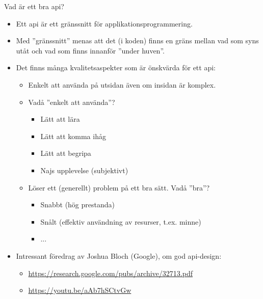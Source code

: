 \begin{Slide}{Vad är ett bra api?}
\begin{itemize}\SlideFontSmall
  \item Ett api  är ett gränssnitt för applikationsprogrammering.
  \item Med ''gränssnitt'' menas att det (i koden) finns en gräns mellan vad som syns utåt och vad som finns innanför ''under huven''.
  \item Det finns många kvalitetsaspekter som är önskvärda för ett api:
\begin{itemize}\SlideFontSmall
  \item Enkelt att använda på utsidan även om insidan är komplex.
  \item Vadå ''enkelt att använda''?
  \begin{itemize}\SlideFontTiny
  \item Lätt att lära
  \item Lätt att komma ihåg
  \item Lätt att begripa
  \item Najs upplevelse (subjektivt)
  \end{itemize}  
  \item Löser ett (generellt) problem på ett bra sätt. Vadå ''bra''?
  \begin{itemize}\SlideFontTiny
    \item Snabbt (hög prestanda)
    \item Snålt (effektiv användning av resurser, t.ex. minne)
    \item ...
  \end{itemize}  
\end{itemize}
\item Intressant föredrag av Joshua Bloch (Google), om god api-design:
   \begin{itemize}\SlideFontTiny
\item
\url{https://research.google.com/pubs/archive/32713.pdf}
\item \url{https://youtu.be/aAb7hSCtvGw}
\end{itemize}
\end{itemize}
\end{Slide}

